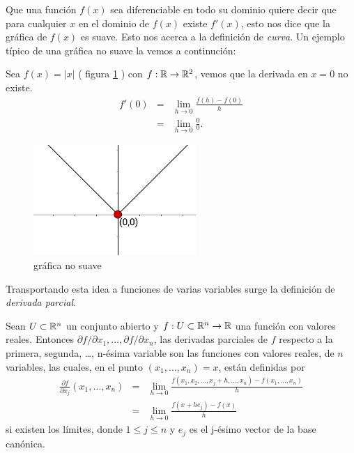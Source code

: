 Que una función $f(x)$ sea diferenciable en todo su dominio quiere decir que para cualquier $x$ en el dominio de $f(x)$ existe
$f'(x)$, esto nos dice que la gráfica de $f(x)$ es suave. Esto nos acerca a la definición de \emph{curva}. Un ejemplo típico 
de una gráfica no suave la vemos a continuci\'on:

\begin{example}
    Sea $f(x) = |x|$ ( figura \ref{fig:no-derivative} ) con $f:\mathbb{R} \rightarrow \mathbb{R}^{2}$, vemos que la derivada en $x=0$ no existe.
    \begin{eqnarray*}
        f'(0) &=& \lim_{h \rightarrow 0} \frac{f(h) - f(0)}{h} \\
              &=& \lim_{h \rightarrow 0} \frac{0}{0} \text{.}
    \end{eqnarray*}
\end{example}

\begin{figure}[!ht]
  \begin{center}
      \includegraphics[width=0.55\textwidth]{gfx/grafica-abs}
      \caption{gráfica no suave}
      \label{fig:no-derivative}
  \end{center}
\end{figure}

Transportando esta idea a funciones de varias variables surge la definición de \emph{derivada parcial}.

\begin{definition}
    Sean $U \subset \mathbb{R}^{n}$ un conjunto abierto y $f:U \subset \mathbb{R}^{n} \rightarrow \mathbb{R}$ una función con valores reales. Entonces $\partial f/\partial x_{1},
    \ldots, \partial f/ \partial x_{n}$, las derivadas parciales de $f$ respecto a la primera, segunda, \dots, n-ésima variable son las funciones con valores
    reales, de $n$ variables, las cuales, en el punto $(x_{1},\ldots,x_{n}) = x$, están definidas por
    \begin{eqnarray*}
        \frac{\partial f}{\partial x_{j}} (x_{1},\ldots,x_{n}) &=& \lim_{h \rightarrow 0} \frac{f(x_{1},x_{2},\ldots,x_{j} + h,\ldots,x_{n}) - f(x_{1},\ldots,x_{n})}{h} \\
                                                               &=& \lim_{h \rightarrow 0} \frac{f(x+he_{j})-f(x)}{h} 
    \end{eqnarray*}
    si existen los límites, donde $1 \le j \le n$ y $e_{j}$ es el j-ésimo vector de la base canónica.
\end{definition}

